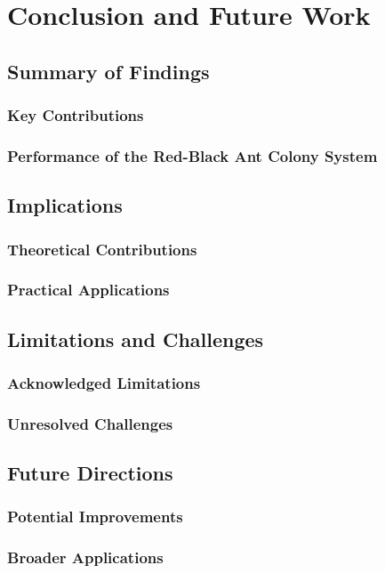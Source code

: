 \chapter{Conclusion and Future Work}\label{chapt:8}

\section{Summary of Findings}

\subsection{Key Contributions}

\subsection{Performance of the Red-Black Ant Colony System}

\section{Implications}

\subsection{Theoretical Contributions}

\subsection{Practical Applications}

\section{Limitations and Challenges}

\subsection{Acknowledged Limitations}

\subsection{Unresolved Challenges}

\section{Future Directions}

\subsection{Potential Improvements}

\subsection{Broader Applications}
